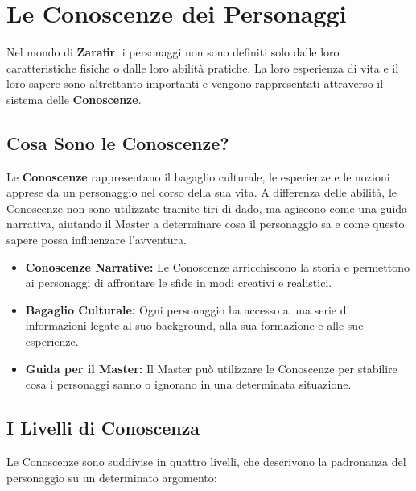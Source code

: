 \documentclass[../manuale_main.tex]{subfiles}
\begin{document}
\section{Le Conoscenze dei Personaggi}

Nel mondo di \textbf{Zarafir}, i personaggi non sono definiti solo dalle loro caratteristiche fisiche o dalle loro abilità pratiche. La loro esperienza di vita e il loro sapere sono altrettanto importanti e vengono rappresentati attraverso il sistema delle \textbf{Conoscenze}. 

\vspace{0.3cm}

\subsection{Cosa Sono le Conoscenze?}
Le \textbf{Conoscenze} rappresentano il bagaglio culturale, le esperienze e le nozioni apprese da un personaggio nel corso della sua vita. A differenza delle abilità, le Conoscenze non sono utilizzate tramite tiri di dado, ma agiscono come una guida narrativa, aiutando il Master a determinare cosa il personaggio sa e come questo sapere possa influenzare l'avventura.

\begin{itemize}
    \item \textbf{Conoscenze Narrative:} Le Conoscenze arricchiscono la storia e permettono ai personaggi di affrontare le sfide in modi creativi e realistici.
    \item \textbf{Bagaglio Culturale:} Ogni personaggio ha accesso a una serie di informazioni legate al suo background, alla sua formazione e alle sue esperienze.
    \item \textbf{Guida per il Master:} Il Master può utilizzare le Conoscenze per stabilire cosa i personaggi sanno o ignorano in una determinata situazione.
\end{itemize}

\vspace{0.3cm}

\subsection{I Livelli di Conoscenza}
Le Conoscenze sono suddivise in quattro livelli, che descrivono la padronanza del personaggio su un determinato argomento:
\end{document}

